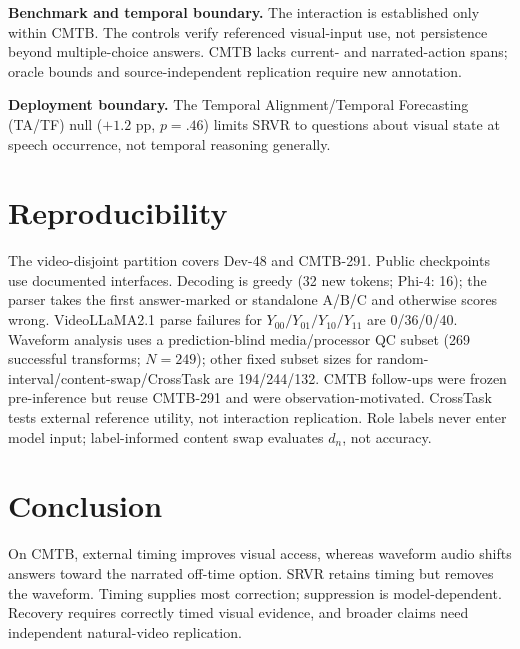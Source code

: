 \textbf{Benchmark and temporal boundary.} The interaction is established only within CMTB. The controls verify referenced visual-input use, not persistence beyond multiple-choice answers. CMTB lacks current- and narrated-action spans; oracle bounds and source-independent replication require new annotation.

\textbf{Deployment boundary.} The Temporal Alignment/Temporal Forecasting (TA/TF) null ($+1.2$ pp, $p=.46$) limits SRVR to questions about visual state at speech occurrence, not temporal reasoning generally.

\section{Reproducibility}
\label{sec:reproducibility}

The video-disjoint partition covers Dev-48 and CMTB-291. Public checkpoints use documented interfaces. Decoding is greedy (32 new tokens; Phi-4: 16); the parser takes the first answer-marked or standalone A/B/C and otherwise scores wrong. VideoLLaMA2.1 parse failures for $Y_{00}/Y_{01}/Y_{10}/Y_{11}$ are 0/36/0/40. Waveform analysis uses a prediction-blind media/processor QC subset (269 successful transforms; $N=249$); other fixed subset sizes for random-interval/content-swap/CrossTask are 194/244/132. CMTB follow-ups were frozen pre-inference but reuse CMTB-291 and were observation-motivated. CrossTask tests external reference utility, not interaction replication. Role labels never enter model input; label-informed content swap evaluates $d_n$, not accuracy.

\section{Conclusion}
\label{sec:conclusion}

On CMTB, external timing improves visual access, whereas waveform audio shifts answers toward the narrated off-time option. SRVR retains timing but removes the waveform. Timing supplies most correction; suppression is model-dependent. Recovery requires correctly timed visual evidence, and broader claims need independent natural-video replication.
